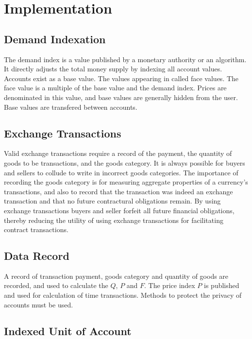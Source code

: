 \section{Implementation}
\label{sec:implementation}

\subsection{Demand Indexation}

The demand index is a value published by a monetary authority or an algorithm. It directly adjusts
the total money supply by indexing all account values. Accounts exist as a base value. The values
appearing in called face values. The face value is a multiple of the base value and the demand
index. Prices are denominated in this value, and base values are generally hidden from the user.
Base values are transfered between accounts.

\subsection{Exchange Transactions}

Valid exchange transactions require a record of the payment, the quantity of goods to be
transactions, and the goods category. It is always possible for buyers and sellers to collude to
write in incorrect goods categories. The importance of recording the goods category is for measuring
aggregate properties of a currency's transactions, and also to record that the transaction was
indeed an exchange transaction and that no future contractural obligations remain. By using exchange
transactions buyers and seller forfeit all future financial obligations, thereby reducing the
utility of using exchange transactions for facilitating contract transactions.

\subsection{Data Record}

A record of transaction payment, goods category and quantity of goods are recorded, and used to
calculate the $Q$, $P$ and $F$. The price index $P$ is published and used for calculation of time
transactions. Methods to protect the privacy of accounts must be used. 

\subsection{Indexed Unit of Account}

